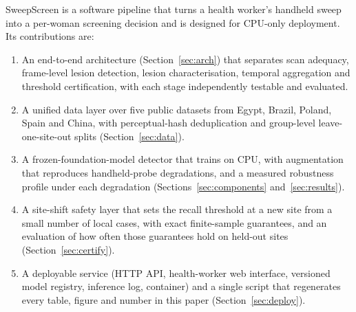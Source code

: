  SweepScreen is a software pipeline that turns a health worker's handheld sweep into a per-woman screening decision and is designed for CPU-only deployment. Its contributions are:
\begin{enumerate}\itemsep1pt
\item An end-to-end architecture (Section~\ref{sec:arch}) that separates scan adequacy, frame-level lesion detection, lesion characterisation, temporal aggregation and threshold certification, with each stage independently testable and evaluated.
\item A unified data layer over five public datasets from Egypt, Brazil, Poland, Spain and China, with perceptual-hash deduplication and group-level leave-one-site-out splits (Section~\ref{sec:data}).
\item A frozen-foundation-model detector that trains on CPU, with augmentation that reproduces handheld-probe degradations, and a measured robustness profile under each degradation (Sections~\ref{sec:components} and~\ref{sec:results}).
\item A site-shift safety layer that sets the recall threshold at a new site from a small number of local cases, with exact finite-sample guarantees, and an evaluation of how often those guarantees hold on held-out sites (Section~\ref{sec:certify}).
\item A deployable service (HTTP API, health-worker web interface, versioned model registry, inference log, container) and a single script that regenerates every table, figure and number in this paper (Section~\ref{sec:deploy}).
\end{enumerate}
